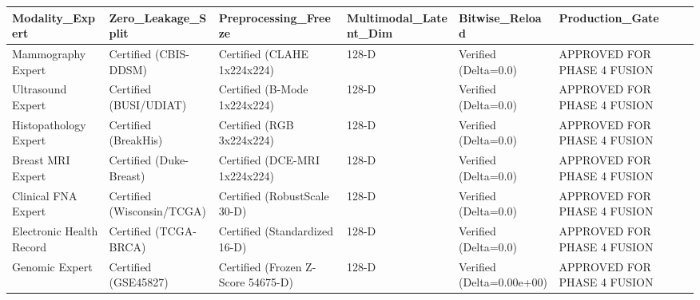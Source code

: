 \begin{tabular}{llllll}
\toprule
Modality_Expert & Zero_Leakage_Split & Preprocessing_Freeze & Multimodal_Latent_Dim & Bitwise_Reload & Production_Gate \\
\midrule
Mammography Expert & Certified (CBIS-DDSM) & Certified (CLAHE 1x224x224) & 128-D & Verified (Delta=0.0) & APPROVED FOR PHASE 4 FUSION \\
Ultrasound Expert & Certified (BUSI/UDIAT) & Certified (B-Mode 1x224x224) & 128-D & Verified (Delta=0.0) & APPROVED FOR PHASE 4 FUSION \\
Histopathology Expert & Certified (BreakHis) & Certified (RGB 3x224x224) & 128-D & Verified (Delta=0.0) & APPROVED FOR PHASE 4 FUSION \\
Breast MRI Expert & Certified (Duke-Breast) & Certified (DCE-MRI 1x224x224) & 128-D & Verified (Delta=0.0) & APPROVED FOR PHASE 4 FUSION \\
Clinical FNA Expert & Certified (Wisconsin/TCGA) & Certified (RobustScale 30-D) & 128-D & Verified (Delta=0.0) & APPROVED FOR PHASE 4 FUSION \\
Electronic Health Record & Certified (TCGA-BRCA) & Certified (Standardized 16-D) & 128-D & Verified (Delta=0.0) & APPROVED FOR PHASE 4 FUSION \\
Genomic Expert & Certified (GSE45827) & Certified (Frozen Z-Score 54675-D) & 128-D & Verified (Delta=0.00e+00) & APPROVED FOR PHASE 4 FUSION \\
\bottomrule
\end{tabular}
